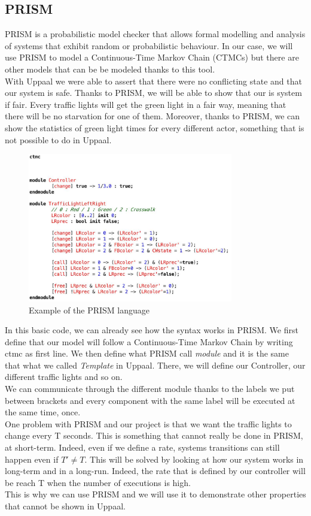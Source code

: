  \subsection{PRISM}
 PRISM is a probabilistic model checker that allows formal modelling and analysis of systems that exhibit random or probabilistic behaviour. In our case, we will use PRISM to model a Continuous-Time Markov Chain (CTMCs) but there are other models that can be be modeled thanks to this tool. \\
 With Uppaal we were able to assert that there were no conflicting state and that our system is safe. Thanks to PRISM, we will be able to show that our is system if fair. Every traffic lights will get the green light in a fair way, meaning that there will be no starvation for one of them. Moreover, thanks to PRISM, we can show the statistics of green light times for every different actor, something that is not possible to do in Uppaal.
 
\begin{figure}[h]\label{fig:prism}
  \begin{center}
    \includegraphics[width=0.8\textwidth]{picture/prism.png}
    \caption{Example of the PRISM language}
  \end{center}
\end{figure} 

\noindent In this basic code, we can already see how the syntax works in PRISM. We first define that our model will follow a Continuous-Time Markov Chain by writing ctmc as first line. We then define what PRISM call \textit{module} and it is the same that what we called \textit{Template} in Uppaal. There, we will define our Controller, our different traffic lights and so on. \\
We can communicate through the different module thanks to the labels we put between brackets and every component with the same label will be executed at the same time, once. \\
One problem with PRISM and our project is that we want the traffic lights to change every T seconds. This is something that cannot really be done in PRISM, at short-term. Indeed, even if we define a rate, systems transitions can still happen even if $T' \ne T $. This will be solved by looking at how our system works in long-term and in a long-run. Indeed, the rate that is defined by our controller will be reach T when the number of executions is high. \\ 
This is why we can use PRISM and we will use it to demonstrate other properties that cannot be shown in Uppaal.
